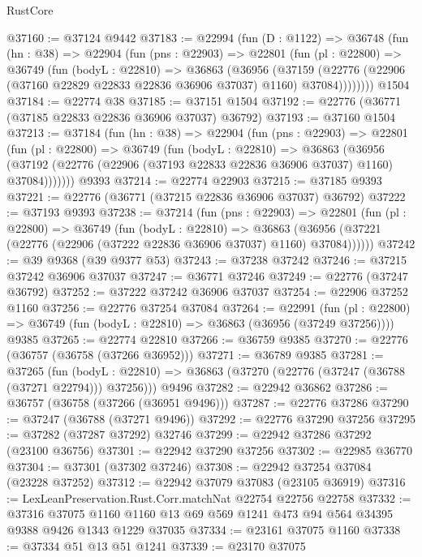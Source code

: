 \begin{lexlean}{RustCore}
\begin{coremodule}
@37160 := @37124 @9442
@37183 := @22994
    (fun (D : @1122) =>
    @36748
      (fun (hn : @38) =>
      @22904
        (fun (pns : @22903) =>
        @22801
          (fun (pl : @22800) =>
          @36749
            (fun (bodyL : @22810) =>
            @36863
              (@36956
                (@37159
                  (@22776 (@22906 (@37160 @22829 @22833 @22836 @36906 @37037) @1160) @37084))))))))
    @1504
@37184 := @22774 @38
@37185 := @37151 @1504
@37192 := @22776 (@36771 (@37185 @22833 @22836 @36906 @37037) @36792)
@37193 := @37160 @1504
@37213 := @37184
    (fun (hn : @38) =>
    @22904
      (fun (pns : @22903) =>
      @22801
        (fun (pl : @22800) =>
        @36749
          (fun (bodyL : @22810) =>
          @36863
            (@36956
              (@37192 (@22776 (@22906 (@37193 @22833 @22836 @36906 @37037) @1160) @37084)))))))
    @9393
@37214 := @22774 @22903
@37215 := @37185 @9393
@37221 := @22776 (@36771 (@37215 @22836 @36906 @37037) @36792)
@37222 := @37193 @9393
@37238 := @37214
    (fun (pns : @22903) =>
    @22801
      (fun (pl : @22800) =>
      @36749
        (fun (bodyL : @22810) =>
        @36863 (@36956 (@37221 (@22776 (@22906 (@37222 @22836 @36906 @37037) @1160) @37084))))))
@37242 := @39 @9368 (@39 @9377 @53)
@37243 := @37238 @37242
@37246 := @37215 @37242 @36906 @37037
@37247 := @36771 @37246
@37249 := @22776 (@37247 @36792)
@37252 := @37222 @37242 @36906 @37037
@37254 := @22906 @37252 @1160
@37256 := @22776 @37254 @37084
@37264 := @22991
    (fun (pl : @22800) => @36749 (fun (bodyL : @22810) => @36863 (@36956 (@37249 @37256))))
    @9385
@37265 := @22774 @22810
@37266 := @36759 @9385
@37270 := @22776 (@36757 (@36758 (@37266 @36952)))
@37271 := @36789 @9385
@37281 := @37265
    (fun (bodyL : @22810) => @36863 (@37270 (@22776 (@37247 (@36788 (@37271 @22794))) @37256)))
    @9496
@37282 := @22942 @36862
@37286 := @36757 (@36758 (@37266 (@36951 @9496)))
@37287 := @22776 @37286
@37290 := @37247 (@36788 (@37271 @9496))
@37292 := @22776 @37290 @37256
@37295 := @37282 (@37287 @37292) @32746
@37299 := @22942 @37286 @37292 (@23100 @36756)
@37301 := @22942 @37290 @37256
@37302 := @22985 @36770
@37304 := @37301 (@37302 @37246)
@37308 := @22942 @37254 @37084 (@23228 @37252)
@37312 := @22942 @37079 @37083 (@23105 @36919)
@37316 := LexLeanPreservation.Rust.Corr.matchNat @22754 @22756 @22758
@37332 := @37316
    @37075
    @1160
    @1160
    @13
    @69
    @569
    @1241
    @473
    @94
    @564
    @34395
    @9388
    @9426
    @1343
    @1229
    @37035
@37334 := @23161 @37075 @1160
@37338 := @37334 @51 @13 @51 @1241
@37339 := @23170 @37075

\end{coremodule}
\end{lexlean}

